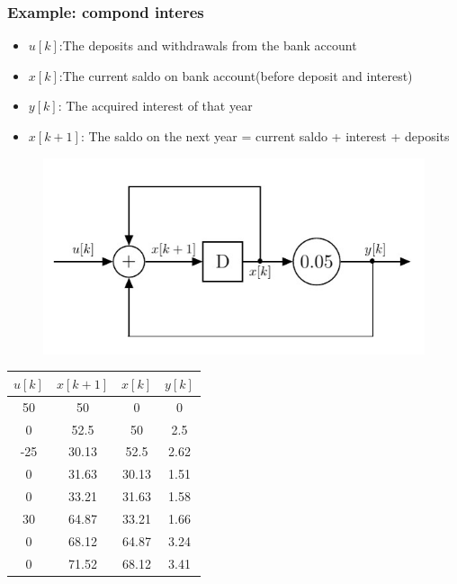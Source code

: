 \begin{frame}
	\frametitle{Example: compond interes}
	\begin{itemize}
			\item $ u[k]$:The deposits and withdrawals from the bank account
			\item $ x[k]$:The current saldo on bank account(before deposit and interest)
			\item $ y[k]$: The acquired interest of that year
			\item $ x[k+1]$: The saldo on the next year = current saldo + interest + deposits
	\end{itemize}

	\begin{figure}
		\centering
		\includegraphics[height=0.45\textheight]{Images/discrete_time_systems_3}
		\label{fig:discrete_time_systems_3}
	\end{figure}
\end{frame}
\begin{frame}
	\begin{tabular}{|c|c|c|c|}
		\hline  $u[k]$& $x[k+1]$  & $x[k]$  & $y[k]$  \\ 
		\hline  50 & 50 & 0  & 0  \\ 
		\hline  0 & 52.5  & 50 & 2.5  \\ 
		\hline  -25 & 30.13 & 52.5 & 2.62  \\ 
		\hline  0 &  31.63 & 30.13  & 1.51  \\ 
		\hline  0 & 33.21  & 31.63 & 1.58 \\ 
		\hline  30 & 64.87 & 33.21  & 1.66 \\ 
		\hline  0 & 68.12 & 64.87 & 3.24  \\ 
		\hline  0 & 71.52 & 68.12 & 3.41 \\
		\hline 
	\end{tabular}
	

\end{frame}
